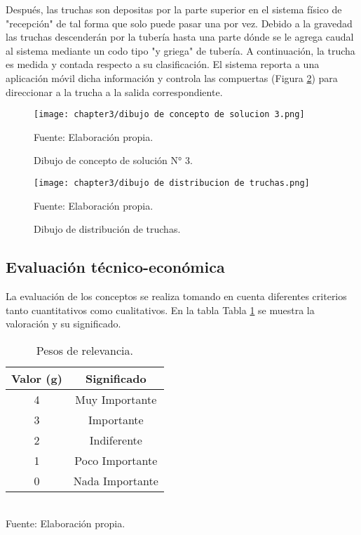 Después, las truchas son depositas por la parte superior en el sistema físico de "recepción" de tal forma que solo puede pasar una por vez. Debido a la gravedad las truchas descenderán por la tubería hasta una parte dónde se le agrega caudal al sistema mediante un codo tipo "y griega" de tubería. A continuación, la trucha es medida y contada respecto a su clasificación. El sistema reporta a una aplicación móvil dicha información y controla las compuertas (Figura \ref{fig:dibujo de distribucion de truchas}) para direccionar a la trucha a la salida correspondiente.

\begin{figure}[H]
	\centering
	\texttt{[image: chapter3/dibujo de concepto de solucion 3.png]}
	\caption{Dibujo de concepto de solución N° 3.}
	Fuente: Elaboración propia.
	\label{fig:dibujo de concepto de solucion 3}
\end{figure}

\begin{figure}[H]
	\centering
	\texttt{[image: chapter3/dibujo de distribucion de truchas.png]}
	\caption{Dibujo de distribución de truchas.}
	Fuente: Elaboración propia.
	\label{fig:dibujo de distribucion de truchas}
\end{figure}

\subsection{Evaluación técnico-económica}

La evaluación de los conceptos se realiza tomando en cuenta diferentes criterios tanto cuantitativos como cualitativos. En la tabla Tabla \ref{tab:pesos de relevancia} se muestra la valoración y su significado.

\begin{table}[H]
	\centering
	\caption{Pesos de relevancia.}
	\label{tab:pesos de relevancia}
	\begin{tabular}{|c|c|}
		\hline
		\rowcolor[HTML]{D9D9D9} 
		\textbf{Valor (g)} & \textbf{Significado} \\ \hline
		4                  & Muy Importante       \\ \hline
		3                  & Importante           \\ \hline
		2                  & Indiferente          \\ \hline
		1                  & Poco Importante      \\ \hline
		0                  & Nada Importante      \\ \hline
	\end{tabular}
	\\Fuente: Elaboración propia.
\end{table}


